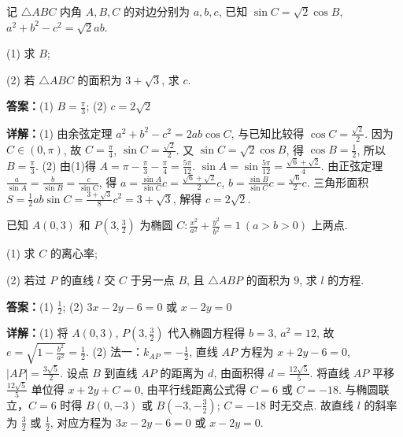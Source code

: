 \begin{question}[points=13]
记 $\triangle ABC$ 内角 $A,B,C$ 的对边分别为 $a,b,c$, 已知 $\sin C = \sqrt{2}\cos B$, $a^2+b^2-c^2 = \sqrt{2}ab$.

(1) 求 $B$;

(2) 若 $\triangle ABC$ 的面积为 $3+\sqrt{3}$, 求 $c$.
\begin{solution}
\textbf{答案：}(1) $B = \frac{\pi}{3}$; (2) $c = 2\sqrt{2}$

\textbf{详解：}(1) 由余弦定理 $a^2+b^2-c^2 = 2ab\cos C$, 与已知比较得 $\cos C = \frac{\sqrt{2}}{2}$. 因为 $C\in(0,\pi)$, 故 $C=\frac{\pi}{4}$, $\sin C = \frac{\sqrt{2}}{2}$. 又 $\sin C = \sqrt{2}\cos B$, 得 $\cos B = \frac{1}{2}$, 所以 $B=\frac{\pi}{3}$.
(2) 由(1)得 $A = \pi - \frac{\pi}{3} - \frac{\pi}{4} = \frac{5\pi}{12}$. $\sin A = \sin\frac{5\pi}{12} = \frac{\sqrt{6}+\sqrt{2}}{4}$. 由正弦定理 $\frac{a}{\sin A} = \frac{b}{\sin B} = \frac{c}{\sin C}$, 得 $a = \frac{\sin A}{\sin C}c = \frac{\sqrt{6}+\sqrt{2}}{2}c$, $b = \frac{\sin B}{\sin C}c = \frac{\sqrt{6}}{2}c$. 三角形面积 $S = \frac{1}{2}ab\sin C = \frac{3+\sqrt{3}}{8}c^2 = 3+\sqrt{3}$, 解得 $c=2\sqrt{2}$.
\end{solution}
\end{question}

\begin{question}[points=15]
已知 $A(0,3)$ 和 $P\left(3, \frac{3}{2}\right)$ 为椭圆 $C: \frac{x^2}{a^2}+\frac{y^2}{b^2}=1\ (a>b>0)$ 上两点.

(1) 求 $C$ 的离心率;

(2) 若过 $P$ 的直线 $l$ 交 $C$ 于另一点 $B$, 且 $\triangle ABP$ 的面积为 $9$, 求 $l$ 的方程.
\begin{solution}
\textbf{答案：}(1) $\frac{1}{2}$; (2) $3x-2y-6=0$ 或 $x-2y=0$

\textbf{详解：}(1) 将 $A(0,3)$, $P(3,\frac{3}{2})$ 代入椭圆方程得 $b=3$, $a^2=12$, 故 $e = \sqrt{1-\frac{b^2}{a^2}} = \frac{1}{2}$.
(2) 法一：$k_{AP} = -\frac{1}{2}$, 直线 $AP$ 方程为 $x+2y-6=0$, $|AP| = \frac{3\sqrt{5}}{2}$. 设点 $B$ 到直线 $AP$ 的距离为 $d$, 由面积得 $d = \frac{12\sqrt{5}}{5}$. 将直线 $AP$ 平移 $\frac{12\sqrt{5}}{5}$ 单位得 $x+2y+C=0$, 由平行线距离公式得 $C=6$ 或 $C=-18$. 与椭圆联立，$C=6$ 时得 $B(0,-3)$ 或 $B(-3,-\frac{3}{2})$; $C=-18$ 时无交点. 故直线 $l$ 的斜率为 $\frac{3}{2}$ 或 $\frac{1}{2}$, 对应方程为 $3x-2y-6=0$ 或 $x-2y=0$.
\end{solution}
\end{question}

